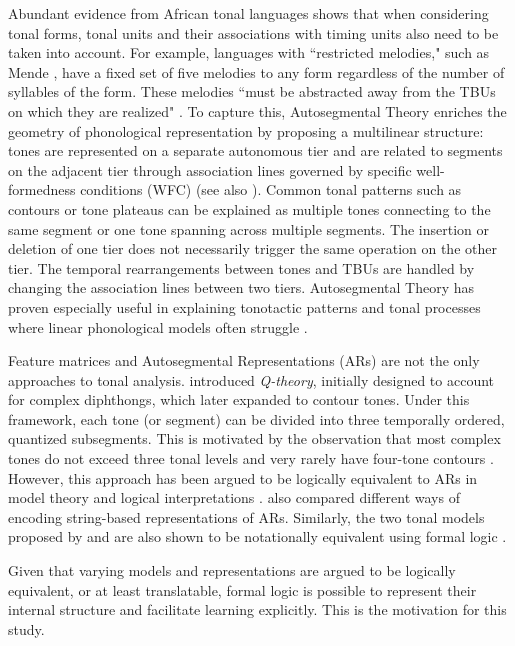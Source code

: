 Abundant evidence from African tonal languages shows that when considering tonal forms, tonal units and their associations with timing units also need to be taken into account. For example, languages with ``restricted melodies," such as Mende \citep{leben2017tone}, have a fixed set of five melodies to any form regardless of the number of syllables of the form. These melodies ``must be abstracted away from the TBUs on which they are realized" \citep{voorhoeve1973safwa,hyman1974universals}. To capture this, Autosegmental Theory \citep{goldsmith1976autosegmental,clements1980vowel} enriches the geometry of phonological representation by proposing a multilinear structure: tones are represented on a separate autonomous tier and are related to segments on the adjacent tier through association lines governed by specific well-formedness conditions (WFC) (see also \citet{clements1984autosegmental}). Common tonal patterns such as contours or tone plateaus can be explained as multiple tones connecting to the same segment or one tone spanning across multiple segments. The insertion or deletion of one tier does not necessarily trigger the same operation on the other tier. The temporal rearrangements between tones and TBUs are handled by changing the association lines between two tiers. Autosegmental Theory has proven especially useful in explaining tonotactic patterns and tonal processes where linear phonological models often struggle \citep{hyman2011tone,oddenbook}. 

Feature matrices and Autosegmental Representations (ARs) are not the only approaches to tonal analysis. \citet{inkelas2013abc+} introduced \textit{Q-theory}, initially designed to account for complex diphthongs, which later expanded to contour tones. Under this framework, each tone (or segment) can be divided into three temporally ordered, quantized subsegments. This is motivated by the observation that most complex tones do not exceed three tonal levels and very rarely have four-tone contours \citep{shih2013subsegmental}. However, this approach has been argued to be logically equivalent to ARs in model theory and logical interpretations \citep{jardine2021qtheory}. \citet{kornai2018formal} also compared different ways of encoding string-based representations of ARs. Similarly, the two tonal models proposed by \citet{yip1989contour} and \citet{bao1999structure} are also shown to be notationally equivalent using formal logic \citep{oakdenNotationalEquivalenceTonal2020}.

Given that varying models and representations are argued to be logically equivalent, or at least translatable, formal logic is possible to represent their internal structure and facilitate learning explicitly. This is the motivation for this study. 

